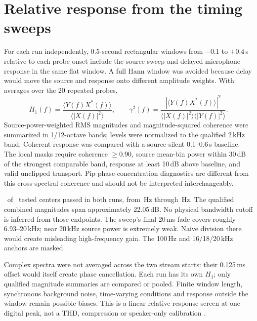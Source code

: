 \documentclass[11pt,letterpaper]{article}
\begin{document}
\section{Relative response from the timing sweeps}
For each run independently, 0.5-second rectangular windows from $-0.1$ to
$+0.4$\,s relative to each probe onset include the source sweep and delayed
microphone response in the same flat window. A full Hann window was avoided
because delay would move the source and response onto different amplitude weights.
With averages over the 20 repeated probes,
\[
H_1(f)=\frac{\langle Y(f)X^*(f)\rangle}{\langle|X(f)|^2\rangle},\qquad
\gamma^2(f)=\frac{|\langle Y(f)X^*(f)\rangle|^2}
{\langle|X(f)|^2\rangle\langle|Y(f)|^2\rangle}.
\]
Source-power-weighted RMS magnitudes and magnitude-squared coherence were
summarized in 1/12-octave bands; levels were normalized to the qualified 2\,kHz
band. Coherent response was compared with a source-silent 0.1--0.6\,s baseline.
The local masks require coherence $\geq0.90$, source mean-bin power within
30\,dB of the strongest comparable band, response at least 10\,dB above baseline,
and valid unclipped transport. Pip phase-concentration diagnostics are different
from this cross-spectral coherence and should not be interpreted interchangeably.

\begin{table}[H]
\centering\small

\caption{Representative 1/12-octave H1 band summaries relative to 2\,kHz. A dash means masked, not zero gain. Coherence alone is insufficient; excitation and baseline conditions must pass as well.}
\end{table}

\AcceptedSweepBands\ of \TotalSweepBands\ tested centers passed in both runs,
from \SupportedLowHz\,Hz through \SupportedHighHz\,Hz. The qualified combined
magnitudes span approximately 22.05\,dB. No physical bandwidth cutoff is inferred
from those endpoints. The sweep's final 20\,ms fade covers roughly 6.93--20\,kHz;
near 20\,kHz source power is extremely weak. Naive division there would create
misleading high-frequency gain. The 100\,Hz and 16/18/20\,kHz anchors are masked.

Complex spectra were not averaged across the two stream starts: their 0.125\,ms
offset would itself create phase cancellation. Each run has its own $H_1$; only
qualified magnitude summaries are compared or pooled. Finite window length,
synchronous background noise, time-varying conditions and response outside the
window remain possible biases. This is a linear relative-response screen at one
digital peak, not a THD, compression or speaker-only calibration \cite{sweep}.
\end{document}
